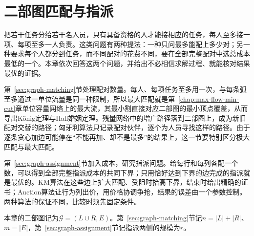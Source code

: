 
\chapter{二部图匹配与指派}
\label{chap:bipartite-matching-assignment}

把若干任务分给若干名人员，只有具备资格的人才能接相应的任务，每人至多接一项、每项至多一人负责。这类问题有两种提法：一种只问最多能配上多少对；另一种要求每个人都分到任务，而不同配对的花费不同，要在全部完整配对中选总成本最低的一个。本章依次回答这两个问题，并给出不必相信求解过程、就能核对结果最优的证据。

第~\ref{sec:graph-matching}节处理配对数量。每人、每项任务至多用一次，与每条弧至多通过一单位流量是同一种限制，所以最大匹配就是第~\ref{chap:max-flow-min-cut}章单位容量网络上的最大流，其最小割直接对应二部图的最小顶点覆盖，从而导出König定理与Hall婚姻定理。残量网络中的增广路径落到二部图上，成为新旧配对交替的路径；匈牙利算法只记录配对伙伴，逐个为人员寻找这样的路径。由于逐条贪心加边可能停在“不能再加、却不是最多”的结果上，这一节要特别区分极大匹配与最大匹配。

第~\ref{sec:graph-assignment}节加入成本，研究指派问题。给每行和每列各配一个数，可以得到全部完整指派成本的共同下界；只用恰好达到下界的边完成的指派就是最优的。KM算法在这些边上扩大匹配、受阻时抬高下界，结束时给出精确的证书；Auction算法让行为列出价，用价格协调争抢，结果的误差由一个参数控制。两种算法的保证不同，比较时须先固定条件。

本章的二部图记为$\mathcal G=(L\cup R,E)$。第~\ref{sec:graph-matching}节记$n=|L|+|R|$、$m=|E|$，第~\ref{sec:graph-assignment}节记指派两侧的规模为$r$。




